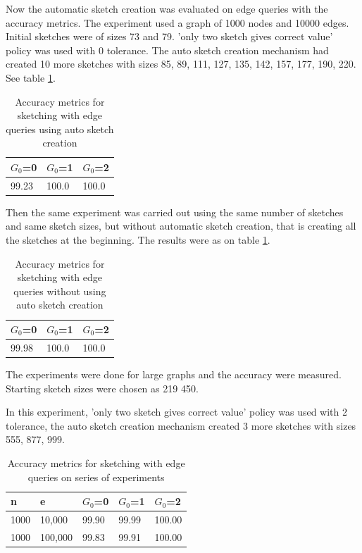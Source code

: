 \documentclass[conference]{IEEEtran}
\begin{document}
Now the automatic sketch creation was evaluated on edge queries with the accuracy metrics. The experiment used a graph of 1000 nodes and 10000 edges. Initial sketches were of sizes 73 and 79. 'only two sketch gives correct value' policy was used with 0 tolerance. The auto sketch creation mechanism had created 10 more sketches with sizes 85, 89, 111, 127, 135, 142, 157, 177, 190, 220. See table \ref{table:Accuracy metrics for sketching with edge queries using auto sketch creation}.

\begin{table}[!t]
\caption{Accuracy metrics for sketching with edge queries using auto sketch creation}
\label{table:Accuracy metrics for sketching with edge queries using auto sketch creation}
\centering
\begin{tabular}{|l|l|l|}
\hline
$G_0$=0 & $G_0$=1 & $G_0$=2 \\ \hline
99.23  &   100.0  &   100.0\\ \hline
\end{tabular}
\end{table}

Then the same experiment was carried out using the same number of sketches and same sketch sizes, but without automatic sketch creation, that is creating all the sketches at the beginning. The results were as on table \ref{table:Accuracy metrics for sketching with edge queries using auto sketch creation}.

\begin{table}[!t]
\caption{Accuracy metrics for sketching with edge queries without using auto sketch creation}
\label{table:Accuracy metrics for sketching with edge queries without using auto sketch creation}
\centering
\begin{tabular}{|l|l|l|}
\hline
$G_0$=0 & $G_0$=1 & $G_0$=2 \\ \hline
99.98  &   100.0  &   100.0\\ \hline
\end{tabular}
\end{table}

The experiments were done for large graphs and the accuracy were measured. Starting sketch sizes were chosen as 219 450. 

In this experiment, 'only two sketch gives correct value' policy was used with 2 tolerance, the auto sketch creation mechanism created 3 more sketches with sizes 555, 877, 999. 

\begin{table}[!b]
\caption{Accuracy metrics for sketching with edge queries on series of experiments}
\label{table:Accuracy metrics for sketching with edge queries on series of experiments}
\centering
\begin{tabular}{|l|l|l|l|l|}
\hline
n    & e     & $G_0$=0 & $G_0$=1 & $G_0$=2 \\ \hline
1000 & 10,000 & 99.90   & 99.99   & 100.00   \\ \hline
1000 & 100,000 & 99.83   & 99.91   & 100.00   \\ \hline
\end{tabular}
\end{table}
\end{document}
